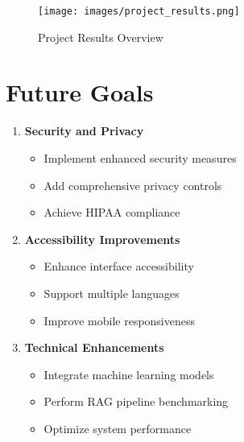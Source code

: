 \begin{figure}[H]
    \centering
    \texttt{[image: images/project\_results.png]}
    \caption{Project Results Overview}
\end{figure}

\section{Future Goals}
\begin{enumerate}
    \item \textbf{Security and Privacy}
    \begin{itemize}
        \item Implement enhanced security measures
        \item Add comprehensive privacy controls
        \item Achieve HIPAA compliance
    \end{itemize}

    \item \textbf{Accessibility Improvements}
    \begin{itemize}
        \item Enhance interface accessibility
        \item Support multiple languages
        \item Improve mobile responsiveness
    \end{itemize}

    \item \textbf{Technical Enhancements}
    \begin{itemize}
        \item Integrate machine learning models
        \item Perform RAG pipeline benchmarking
        \item Optimize system performance
    \end{itemize}
\end{enumerate} 